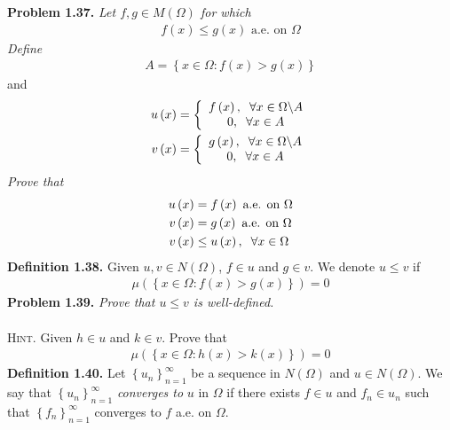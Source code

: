\documentclass[a4paper]{article}
\numberwithin{equation}{section}
\begin{document}
\textbf{Problem 1.37.} \textit{Let $f,g \in M\left(\Omega\right)$ for which}
\begin{align}
f\left( x \right) \le g\left( x \right)\mbox{ a.e. on }\Omega 
\end{align}
\textit{Define}
\begin{align}
A = \left\{ {x \in \Omega :f\left( x \right) > g\left( x \right)} \right\}
\end{align}
and
\begin{align}
u\left( x \right) &= \left\{ {\begin{array}{*{20}{c}}
{f\left( x \right),\hspace{0.2cm}\forall x \in \Omega \backslash A}\\
{0,\hspace{0.2cm}\forall x \in A}
\end{array}} \right.\\
v\left( x \right) &= \left\{ {\begin{array}{*{20}{c}}
{g\left( x \right),\hspace{0.2cm}\forall x \in \Omega \backslash A}\\
{0,\hspace{0.2cm}\forall x \in A}
\end{array}} \right.
\end{align}
\textit{Prove that}
\begin{align}
u\left( x \right) &= f\left( x \right)\mbox{ a.e. on }\Omega \\
v\left( x \right) &= g\left( x \right)\mbox{ a.e. on }\Omega \\
v\left( x \right) &\le u\left( x \right),\hspace{0.2cm}\forall x \in \Omega 
\end{align}
\textbf{Definition 1.38.} Given $u,v \in N\left(\Omega\right)$, $f\in u$ and $g\in v$. We denote $u\le v$ if 
\begin{align}
\mu \left( {\left\{ {x \in \Omega :f\left( x \right) > g\left( x \right)} \right\}} \right) = 0
\end{align}
\textbf{Problem 1.39.} \textit{Prove that $u\le v$ is well-defined.}\\
\\
\textsc{Hint.} Given $h\in u$ and $k\in v$. Prove that
\begin{align}
\mu \left( {\left\{ {x \in \Omega :h\left( x \right) > k\left( x \right)} \right\}} \right) = 0
\end{align}
\textbf{Definition 1.40.} Let $\left\{ {{u_n}} \right\}_{n = 1}^\infty $ be a sequence in $N\left(\Omega\right)$ and $u\in N\left(\Omega\right)$. We say that $\left\{ {{u_n}} \right\}_{n = 1}^\infty $ \textit{converges to} $u$ in $\Omega$ if there exists $f \in u$ and $f_n\in u_n$ such that $\left\{ {{f_n}} \right\}_{n = 1}^\infty $ converges to $f$ a.e. on $\Omega$.\\
\end{document}
